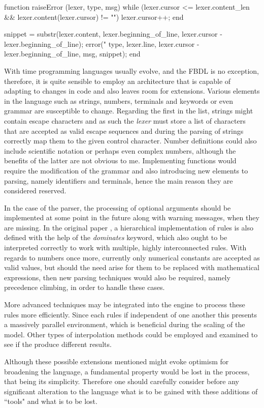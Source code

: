 \begin{octave}
function raiseError (lexer, type, msg)
  while (lexer.cursor <= lexer.content_len &&
       lexer.content(lexer.cursor) != "\n")
    lexer.cursor++;
  end

  snippet = substr(lexer.content,
  lexer.beginning_of_line, lexer.cursor - lexer.beginning_of_line);
  error("%
    type, lexer.line, lexer.cursor - lexer.beginning_of_line,
    msg, snippet);
end
\end{octave}


With time programming languages usually evolve, and the FBDL is no exception, therefore, it is quite sensible to employ an architecture that is capable of adapting to changes in code and also leaves room for extensions. Various elements in the language such as strings, numbers, terminals and keywords or even grammar are susceptible to change. Regarding the first in the list, strings might contain escape characters and as such the \textit{lexer} must store a list of characters that are accepted as valid escape sequences and during the parsing of strings correctly map them to the given control character. Number definitions could also include scientific notation or perhaps even complex numbers, although the benefits of the latter are not obvious to me. Implementing functions would require the modification of the grammar and also introducing new elements to parsing, namely identifiers and terminals, hence the main reason they are considered reserved.

In the case of the parser, the processing of optional arguments should be implemented at some point in the future along with warning messages, when they are missing. In the original paper \cite{pillerkovacs2015}, a hierarchical implementation of rules is also defined with the help of the \textit{dominates} keyword, which also ought to be interpreted correctly to work with multiple, highly interconnected rules. With regards to numbers once more, currently only numerical constants are accepted as valid values, but should the need arise for them to be replaced with mathematical expressions, then new parsing techniques would also be required, namely precedence climbing, in order to handle these cases.

More advanced techniques may be integrated into the engine to process these rules more efficiently. Since each rules if independent of one another this presents a massively parallel environment, which is beneficial during the scaling of the model. Other types of interpolation methods could be employed and examined to see if the produce different results.

Although these possible extensions mentioned might evoke optimism for broadening the language, a fundamental property would be lost in the process, that being its simplicity. Therefore one should carefully consider before any significant alteration to the language what is to be gained with these additions of ``tools" and what is to be lost.
